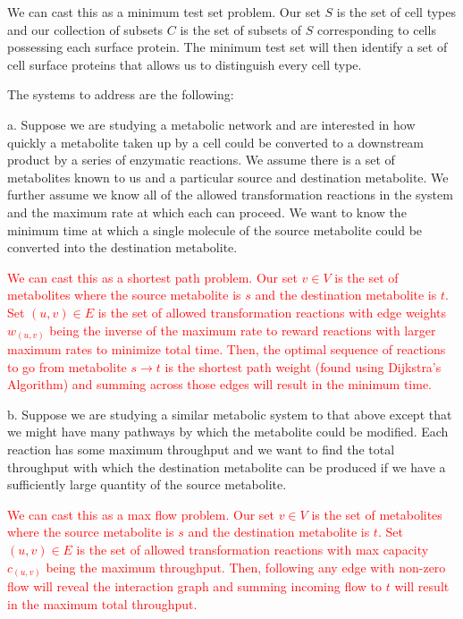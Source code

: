 \documentclass[11pt]{article}
\begin{document}
\hspace*{0.5in}
\begin{minipage}{5.5in}
We can cast this as a minimum test set problem.  Our set $S$
is the set of cell types and our collection of subsets $C$ is the set of subsets of $S$ corresponding to cells possessing each surface protein. The minimum test set will then identify a set of cell surface proteins that allows us to distinguish every cell type.
\end{minipage}

The systems to address are the following:

a. Suppose we are studying a metabolic network and are interested in
how quickly a metabolite taken up by a cell could be converted to a downstream product by a series of enzymatic reactions.  We assume there is a set of metabolites known to us and a particular source and destination metabolite.  We further assume we know all of the allowed transformation reactions in the system and the maximum rate at which each can proceed.  We want to know the minimum time at which a single molecule of the source metabolite could be converted into the destination metabolite.

\textcolor{red}{We can cast this as a shortest path problem. Our set $v \in V$ is the set of metabolites where the source metabolite is $s$ and the destination metabolite is $t$. Set $(u, v) \in E$ is the set of allowed transformation reactions with edge weights $w_{(u,v)}$ being the inverse of the maximum rate to reward reactions with larger maximum rates to minimize total time. Then, the optimal sequence of reactions to go from metabolite $s \rightarrow t$ is the shortest path weight (found using Dijkstra's Algorithm) and summing across those edges will result in the minimum time.}

b. Suppose we are studying a similar metabolic system to that above except that we might have many pathways by which the metabolite could be modified.  Each reaction has some maximum throughput and we want to find the total throughput with which the destination metabolite can be produced if we have a sufficiently large quantity of the source metabolite.

\textcolor{red}{We can cast this as a max flow problem. Our set $v \in V$ is the set of metabolites where the source metabolite is $s$ and the destination metabolite is $t$. Set $(u, v) \in E$ is the set of allowed transformation reactions with max capacity $c_{(u,v)}$ being the maximum throughput. Then, following any edge with non-zero flow will reveal the interaction graph and summing incoming flow to $t$ will result in the maximum total throughput.}
\end{document}
